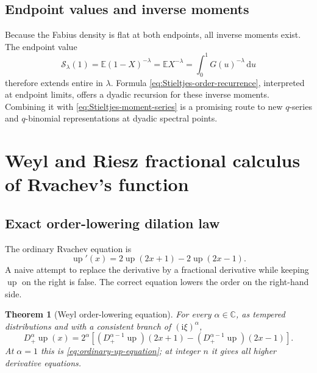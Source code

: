 \documentclass[11pt,oneside]{article}
\newtheorem{theorem}{Theorem}[section]
\theoremstyle{definition}
\theoremstyle{remark}
\newcommand{\C}{\mathbb C}
\newcommand{\E}{\mathbb E}
\newcommand{\Up}{\operatorname{up}}
\newcommand{\dd}{\,\mathrm d}
\newcommand{\ii}{\mathrm i}
\newcommand{\Sord}{\mathcal S}
\begin{document}
\subsection{Endpoint values and inverse moments}

Because the Fabius density is flat at both endpoints, all inverse moments
exist.  The endpoint value
\begin{equation}
 \Sord_\lambda(1)
 =\E(1-X)^{-\lambda}
 =\E X^{-\lambda}
 =\int_0^1G(u)^{-\lambda}\dd u
 \label{eq:Stieltjes-endpoint-negative-moment}
\end{equation}
therefore extends entire in $\lambda$.  Formula
\eqref{eq:Stieltjes-order-recurrence}, interpreted at endpoint limits, offers
a dyadic recursion for these inverse moments.  Combining it with
\eqref{eq:Stieltjes-moment-series} is a promising route to new $q$-series and
$q$-binomial representations at dyadic spectral points.

\section{Weyl and Riesz fractional calculus of Rvachev's function}
\label{sec:weyl-riesz}

\subsection{Exact order-lowering dilation law}

The ordinary Rvachev equation \cite{arias1982,Rvachev1990} is
\begin{equation}
 \Up'(x)=2\Up(2x+1)-2\Up(2x-1).
 \label{eq:ordinary-up-equation}
\end{equation}
A naive attempt to replace the derivative by a fractional derivative while
keeping $\Up$ on the right is false.  The correct equation lowers the order on
the right-hand side.

\begin{theorem}[Weyl order-lowering equation]
\label{thm:Weyl-dilation}
For every $\alpha\in\C$, as tempered distributions and with a consistent
branch of $(\ii\xi)^\alpha$,
\begin{equation}
 D_+^\alpha\Up(x)
 =2^\alpha\left[
 (D_+^{\alpha-1}\Up)(2x+1)
 -(D_+^{\alpha-1}\Up)(2x-1)
 \right].
 \label{eq:Weyl-order-lowering}
\end{equation}
At $\alpha=1$ this is \eqref{eq:ordinary-up-equation}; at integer $n$ it gives
all higher derivative equations.
\end{theorem}
\end{document}
